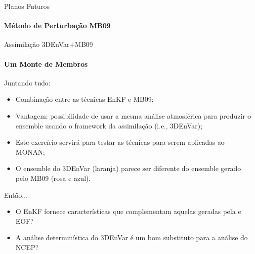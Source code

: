 \documentclass[10pt,aspectratio=169]{beamer}
\begin{document}
  \begin{frame}{Planos Futuros}
 \framesubtitle{Método de Perturbação MB09}

 \end{frame}

\begin{frame}{Assimilação 3DEnVar+MB09}
\framesubtitle{Um Monte de Membros}
\begin{block}{Juntando tudo:}
	\begin{itemize}
		\item Combinação entre as técnicas EnKF e MB09;
		\pause
		\item Vantagem: possibilidade de usar a mesma análise atmosférica para produzir o ensemble usando o framework da assimilação (i.e., 3DEnVar);
		\pause
		\item Este exercício servirá para testar as técnicas para serem aplicadas ao MONAN;
		\pause
		\item O ensemble do 3DEnVar (laranja) parece ser diferente do ensemble gerado pelo MB09 (rosa e azul).
	\end{itemize}
\end{block}
\pause
\begin{block}{Então...}
	\begin{itemize}
		\item O EnKF fornece características que complementam aquelas geradas pela e EOF? 
		\item A análise determinística do 3DEnVar é um bom substituto para a análise do NCEP?
	\end{itemize}
\end{block}
\end{frame}
\end{document}
